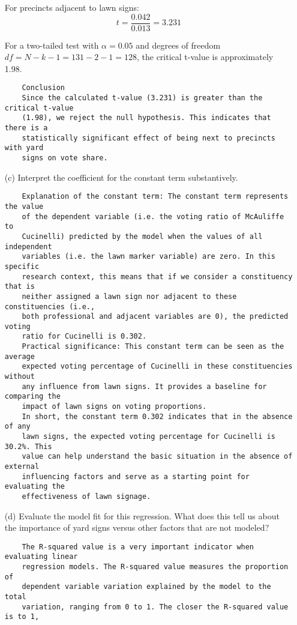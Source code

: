 \documentclass[12pt,letterpaper]{article}
\begin{document}
\begin{enumerate}
	For precincts adjacent to lawn signs:
	\[ t = \frac{0.042}{0.013} = 3.231 \]
	
	For a two-tailed test with \(\alpha = 0.05\) and degrees of freedom \(df = N - k - 1 = 131 - 2 - 1 = 128\), the critical t-value is approximately 1.98.
	\begin{verbatim}
	Conclusion
	Since the calculated t-value (3.231) is greater than the critical t-value 
	(1.98), we reject the null hypothesis. This indicates that there is a 
	statistically significant effect of being next to precincts with yard 
	signs on vote share.
	\end{verbatim}
	\vspace{7cm}
	\newpage
	\item [(c)] Interpret the coefficient for the constant term substantively.
	\begin{verbatim}
	Explanation of the constant term: The constant term represents the value 
	of the dependent variable (i.e. the voting ratio of McAuliffe to 
	Cucinelli) predicted by the model when the values of all independent 
	variables (i.e. the lawn marker variable) are zero. In this specific 
	research context, this means that if we consider a constituency that is 
	neither assigned a lawn sign nor adjacent to these constituencies (i.e., 
	both professional and adjacent variables are 0), the predicted voting 
	ratio for Cucinelli is 0.302.
	Practical significance: This constant term can be seen as the average 
	expected voting percentage of Cucinelli in these constituencies without 
	any influence from lawn signs. It provides a baseline for comparing the 
	impact of lawn signs on voting proportions.
	In short, the constant term 0.302 indicates that in the absence of any 
	lawn signs, the expected voting percentage for Cucinelli is 30.2%. This 
	value can help understand the basic situation in the absence of external 
	influencing factors and serve as a starting point for evaluating the 
	effectiveness of lawn signage.
	\end{verbatim}
	\item [(d)] Evaluate the model fit for this regression.  What does this	tell us about the importance of yard signs versus other factors that are not modeled?
	\begin{verbatim}
	The R-squared value is a very important indicator when evaluating linear 
	regression models. The R-squared value measures the proportion of 
	dependent variable variation explained by the model to the total 
	variation, ranging from 0 to 1. The closer the R-squared value is to 1, 

\end{verbatim}
\end{enumerate}
\end{document}
